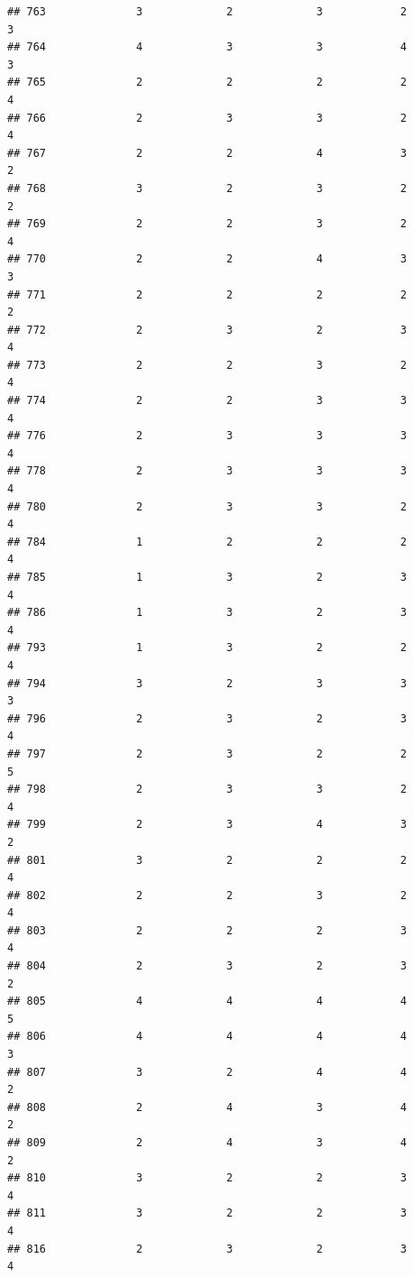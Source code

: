 \documentclass[
]{article}
\begin{document}
\begin{verbatim}
## 763              3             2             3            2          3
## 764              4             3             3            4          3
## 765              2             2             2            2          4
## 766              2             3             3            2          4
## 767              2             2             4            3          2
## 768              3             2             3            2          2
## 769              2             2             3            2          4
## 770              2             2             4            3          3
## 771              2             2             2            2          2
## 772              2             3             2            3          4
## 773              2             2             3            2          4
## 774              2             2             3            3          4
## 776              2             3             3            3          4
## 778              2             3             3            3          4
## 780              2             3             3            2          4
## 784              1             2             2            2          4
## 785              1             3             2            3          4
## 786              1             3             2            3          4
## 793              1             3             2            2          4
## 794              3             2             3            3          3
## 796              2             3             2            3          4
## 797              2             3             2            2          5
## 798              2             3             3            2          4
## 799              2             3             4            3          2
## 801              3             2             2            2          4
## 802              2             2             3            2          4
## 803              2             2             2            3          4
## 804              2             3             2            3          2
## 805              4             4             4            4          5
## 806              4             4             4            4          3
## 807              3             2             4            4          2
## 808              2             4             3            4          2
## 809              2             4             3            4          2
## 810              3             2             2            3          4
## 811              3             2             2            3          4
## 816              2             3             2            3          4

\end{verbatim}
\end{document}
